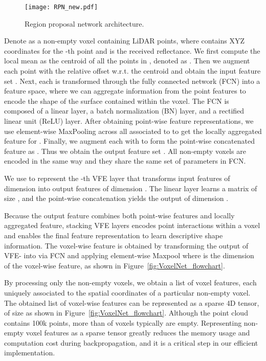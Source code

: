 \documentclass[10pt,twocolumn,letterpaper]{article}
\begin{document}
\begin{figure*}[!t]
\centering
    \texttt{[image: RPN\_new.pdf]}
    \vspace{-0.3cm}
\caption{Region proposal network architecture.}
\label{fig:RPN}
\end{figure*}


Denote  as a non-empty voxel containing  LiDAR points, where  contains XYZ coordinates for the -th point and  is the received reflectance. We first compute the local mean as the centroid of all the points in , denoted as . Then we augment each point  with the relative offset w.r.t. the centroid  and obtain the input feature set . Next, each  is transformed through the fully connected network (FCN) into a feature space, where we can aggregate information from the point features  to encode the shape of the surface contained within the voxel. The FCN is composed of a linear layer, a batch normalization (BN) layer, and a rectified linear unit (ReLU) layer. After obtaining point-wise feature representations, we use element-wise MaxPooling across all  associated to  to get the locally aggregated feature  for . Finally, we augment each  with  to form the point-wise concatenated feature as . Thus we obtain the output feature set . All non-empty voxels are encoded in the same way and they share the same set of parameters in FCN. 

We use  to represent the -th VFE layer that transforms input features of dimension  into output features of dimension . The linear layer learns a matrix of size , and the point-wise concatenation yields the output of dimension .

Because the output feature combines both point-wise features and locally aggregated feature, stacking VFE layers encodes point interactions within a voxel and enables the final feature representation to learn descriptive shape information. The voxel-wise feature is obtained by transforming the output of VFE- into  via FCN and applying element-wise Maxpool where  is the dimension of the voxel-wise feature, as shown in Figure~\ref{fig:VoxelNet_flowchart}.


 By processing only the non-empty voxels, we obtain a list of voxel features, each uniquely associated to the spatial coordinates of a particular non-empty voxel. The obtained list of voxel-wise features can be represented as a sparse 4D tensor, of size  as shown in Figure~\ref{fig:VoxelNet_flowchart}. Although the point cloud contains 100k points, more than  of voxels typically are empty. Representing non-empty voxel features as a sparse tensor greatly reduces the memory usage and computation cost during backpropagation, and it is a critical step in our efficient implementation.
\end{document}
